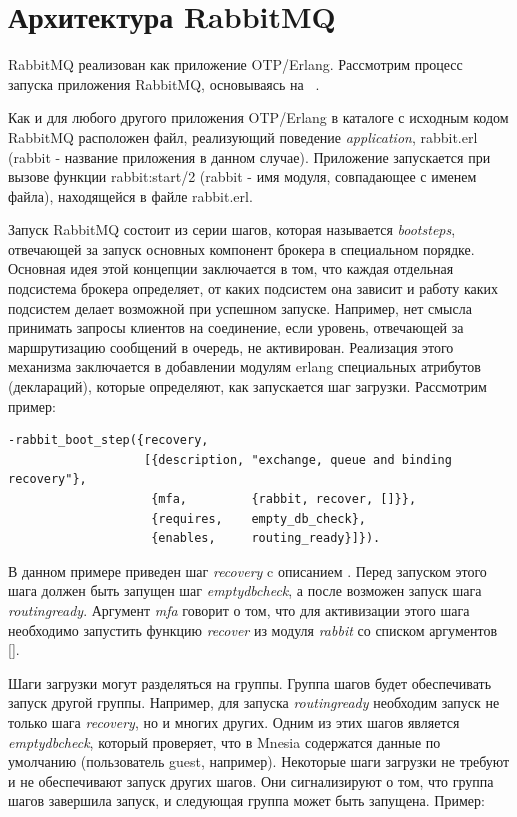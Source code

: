 \section{Архитектура RabbitMQ}
RabbitMQ реализован как приложение OTP/Erlang. Рассмотрим процесс запуска приложения RabbitMQ, основываясь на ~\cite{rabbit_boot_step}.\par Как и для любого другого приложения OTP/Erlang в каталоге с исходным кодом RabbitMQ расположен файл, реализующий поведение \textit{application}, rabbit.erl (rabbit - название приложения в данном случае). Приложение запускается при вызове функции rabbit:start/2 (rabbit - имя модуля, совпадающее с именем файла), находящейся в файле rabbit.erl.\par
Запуск RabbitMQ состоит из серии шагов, которая называется \textit{boot\thinspace steps}, отвечающей за запуск основных компонент брокера в специальном порядке. Основная идея этой концепции заключается в том, что каждая отдельная подсистема брокера определяет, от каких подсистем она зависит и работу каких подсистем делает возможной при успешном запуске. Например, нет смысла принимать запросы клиентов на соединение, если уровень, отвечающей за маршрутизацию сообщений в очередь, не активирован. Реализация этого механизма заключается в добавлении модулям erlang специальных атрибутов (деклараций),  которые определяют, как запускается шаг загрузки. Рассмотрим пример:
\begin{lstlisting}
-rabbit_boot_step({recovery,
                   [{description, "exchange, queue and binding recovery"},
                    {mfa,         {rabbit, recover, []}},
                    {requires,    empty_db_check},
                    {enables,     routing_ready}]}).
\end{lstlisting}
В данном примере приведен шаг \textit{recovery} c описанием . 
Перед запуском этого шага должен быть запущен шаг \textit{empty\underline{\hspace{0.25cm}}db\underline{\hspace{0.25cm}}check}, а после возможен запуск шага \textit{routing\underline{\hspace{0.25cm}}ready}. Аргумент \textit{mfa} говорит о том, что для активизации этого шага необходимо запустить функцию \textit{recover} из модуля \textit{rabbit} со списком аргументов [].\par
Шаги загрузки могут разделяться на группы. Группа шагов будет обеспечивать запуск другой группы. Например, для запуска \textit{routing\underline{\hspace{0.25cm}}ready} необходим запуск не только шага \textit{recovery}, но и многих других. Одним из этих шагов является \textit{empty\underline{\hspace{0.25cm}}db\underline{\hspace{0.25cm}}check}, который проверяет, что в Mnesia содержатся данные по умолчанию (пользователь guest, например). Некоторые шаги загрузки не требуют и не обеспечивают запуск других шагов. Они сигнализируют о том, что группа шагов завершила запуск, и следующая группа может быть запущена. Пример:
